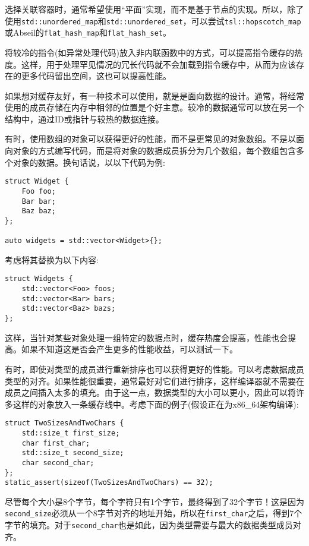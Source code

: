 选择关联容器时，通常希望使用“平面”实现，而不是基于节点的实现。所以，除了使用\texttt{std::unordered\_map}和\texttt{std::unordered\_set}，可以尝试\texttt{tsl::hopscotch\_map}或Abseil的\texttt{flat\_hash\_map}和\texttt{flat\_hash\_set}。

将较冷的指令(如异常处理代码)放入非内联函数中的方式，可以提高指令缓存的热度。这样，用于处理罕见情况的冗长代码就不会加载到指令缓存中，从而为应该存在的更多代码留出空间，这也可以提高性能。


如果想对缓存友好，有一种技术可以使用，就是是面向数据的设计。通常，将经常使用的成员存储在内存中相邻的位置是个好主意。较冷的数据通常可以放在另一个结构中，通过ID或指针与较热的数据连接。

有时，使用数组的对象可以获得更好的性能，而不是更常见的对象数组。不是以面向对象的方式编写代码，而是将对象的数据成员拆分为几个数组，每个数组包含多个对象的数据。换句话说，以以下代码为例:

\begin{lstlisting}[style=styleCXX]
struct Widget {
	Foo foo;
	Bar bar;
	Baz baz;
};

auto widgets = std::vector<Widget>{};
\end{lstlisting}

考虑将其替换为以下内容:

\begin{lstlisting}[style=styleCXX]
struct Widgets {
	std::vector<Foo> foos;
	std::vector<Bar> bars;
	std::vector<Baz> bazs;
};
\end{lstlisting}

这样，当针对某些对象处理一组特定的数据点时，缓存热度会提高，性能也会提高。如果不知道这是否会产生更多的性能收益，可以测试一下。

有时，即使对类型的成员进行重新排序也可以获得更好的性能。可以考虑数据成员类型的对齐。如果性能很重要，通常最好对它们进行排序，这样编译器就不需要在成员之间插入太多的填充。由于这一点，数据类型的大小可以更小，因此可以将许多这样的对象放入一条缓存线中。考虑下面的例子(假设正在为x86\_64架构编译):

\begin{lstlisting}[style=styleCXX]
struct TwoSizesAndTwoChars {
	std::size_t first_size;
	char first_char;
	std::size_t second_size;
	char second_char;
};
static_assert(sizeof(TwoSizesAndTwoChars) == 32);
\end{lstlisting}

尽管每个大小是8个字节，每个字符只有1个字节，最终得到了32个字节！这是因为\texttt{second\_size}必须从一个8字节对齐的地址开始，所以在\texttt{first\_char}之后，得到7个字节的填充。对于\texttt{second\_char}也是如此，因为类型需要与最大的数据类型成员对齐。

